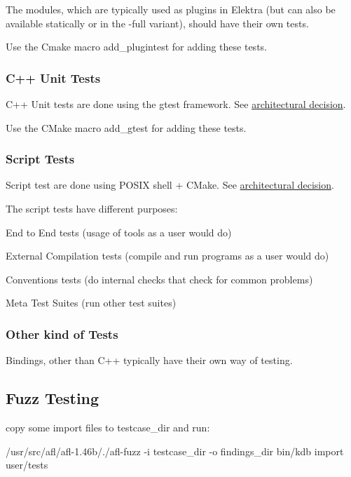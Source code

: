 The modules, which are typically used as plugins in Elektra (but can also be available statically or in the -\/full variant), should have their own tests.

Use the Cmake macro add\+\_\+plugintest for adding these tests.

\subsubsection*{C++ Unit Tests}

C++ Unit tests are done using the gtest framework. See \hyperlink{doc_decisions_unit_testing_md}{architectural decision}.

Use the C\+Make macro add\+\_\+gtest for adding these tests.

\subsubsection*{Script Tests}

Script test are done using P\+O\+S\+I\+X shell + C\+Make. See \hyperlink{doc_decisions_script_testing_md}{architectural decision}.

The script tests have different purposes\+:
\begin{DoxyItemize}
\item End to End tests (usage of tools as a user would do)
\item External Compilation tests (compile and run programs as a user would do)
\item Conventions tests (do internal checks that check for common problems)
\item Meta Test Suites (run other test suites)
\end{DoxyItemize}

\subsubsection*{Other kind of Tests}

Bindings, other than C++ typically have their own way of testing.

\subsection*{Fuzz Testing}

copy some import files to testcase\+\_\+dir and run\+:

/usr/src/afl/afl-\/1.46b/./afl-\/fuzz -\/i testcase\+\_\+dir -\/o findings\+\_\+dir bin/kdb import user/tests 